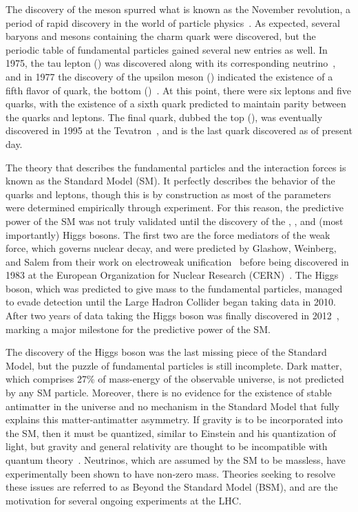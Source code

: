 The discovery of the \PJGy meson spurred what is known as the November revolution, a period of rapid discovery in the world of particle physics~\cite{revolution}. As expected, several baryons and mesons containing the charm quark were discovered, but the periodic table of fundamental particles gained several new entries as well. In 1975, the tau lepton (\PGt) was discovered along with its corresponding neutrino~\cite{tau_discovery}, and in 1977 the discovery of the upsilon meson (\PGU) indicated the existence of a fifth flavor of quark, the bottom (\PQb)~\cite{upsilon_discovery}. At this point, there were six leptons and five quarks, with the existence of a sixth quark predicted to maintain parity between the quarks and leptons. The final quark, dubbed the top (\PQt), was eventually discovered in 1995 at the Tevatron~\cite{top_discovery}, and is the last quark discovered as of present day.

The theory that describes the fundamental particles and the interaction forces is known as the Standard Model (SM). It perfectly describes the behavior of the quarks and leptons, though this is by construction as most of the parameters were determined empirically through experiment. For this reason, the predictive power of the SM was not truly validated until the discovery of the \PW, \PZ, and (most importantly) Higgs bosons. The first two are the force mediators of the weak force, which governs nuclear decay, and were predicted by Glashow, Weinberg, and Salem from their work on electroweak unification~\cite{ew_nobelprize} before being discovered in 1983 at the European Organization for Nuclear Research (CERN)~\cite{w_discovery,z_discovery}. The Higgs boson, which was predicted to give mass to the fundamental particles, managed to evade detection until the Large Hadron Collider began taking data in 2010. After two years of data taking the Higgs boson was finally discovered in 2012~\cite{higgs_atlas,higgs_cms}, marking a major milestone for the predictive power of the SM.

The discovery of the Higgs boson was the last missing piece of the Standard Model, but the puzzle of fundamental particles is still incomplete. Dark matter, which comprises 27\% of mass-energy of the observable universe, is not predicted by any SM particle. Moreover, there is no evidence for the existence of stable antimatter in the universe and no mechanism in the Standard Model that fully explains this matter-antimatter asymmetry. If gravity is to be incorporated into the SM, then it must be quantized, similar to Einstein and his quantization of light, but gravity and general relativity are thought to be incompatible with quantum theory~\cite{sm_grav}. Neutrinos, which are assumed by the SM to be massless, have experimentally been shown to have non-zero mass. Theories seeking to resolve these issues are referred to as Beyond the Standard Model (BSM), and are the motivation for several ongoing experiments at the LHC.

